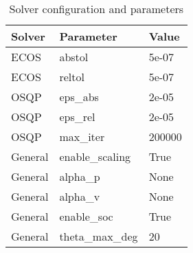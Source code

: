\begin{table}[t]
\centering
\begin{tabular}{lll}
\toprule
Solver & Parameter & Value \\
\midrule
ECOS & abstol & 5e-07 \\
ECOS & reltol & 5e-07 \\
OSQP & eps_abs & 2e-05 \\
OSQP & eps_rel & 2e-05 \\
OSQP & max_iter & 200000 \\
General & enable_scaling & True \\
General & alpha_p & None \\
General & alpha_v & None \\
General & enable_soc & True \\
General & theta_max_deg & 20 \\
\bottomrule
\end{tabular}
\caption{Solver configuration and parameters}
\label{tab:solver_settings}
\end{table}
